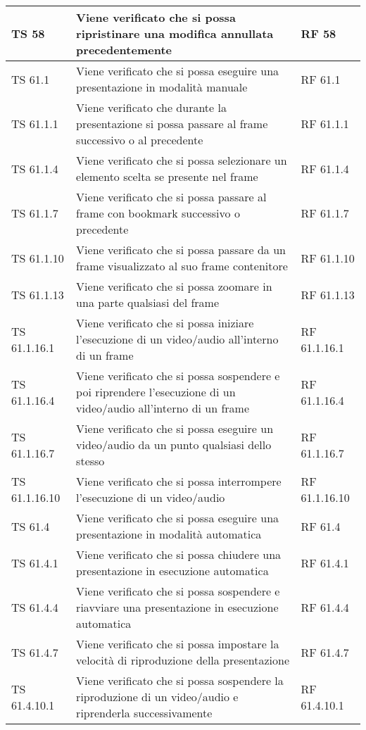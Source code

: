 {{\begin{longtable} [c]{| p{3cm} | p{6cm} |p{3cm}|}
			\hline
			TS 58 & Viene verificato che si possa ripristinare una modifica annullata precedentemente  & RF 58\\
			\hline
			TS 61.1 & Viene verificato che si possa eseguire una presentazione in modalità manuale & RF 61.1\\
			\hline
			TS 61.1.1 & Viene verificato che durante la presentazione si possa passare al frame\ped{g} successivo o al precedente & RF 61.1.1\\
			\hline
			TS 61.1.4 & Viene verificato che si possa selezionare un elemento scelta\ped{g} se presente nel frame\ped{g} & RF 61.1.4\\
			\hline
			TS 61.1.7 & Viene verificato che si possa passare al frame\ped{g} con bookmark\ped{g} successivo o precedente & RF 61.1.7\\
			\hline
			TS 61.1.10 & Viene verificato che si possa passare da un frame\ped{g} visualizzato al suo frame\ped{g} contenitore & RF 61.1.10\\
			\hline
			TS 61.1.13 & Viene verificato che si possa zoomare in una parte qualsiasi del frame\ped{g} & RF 61.1.13\\
			\hline
			TS 61.1.16.1 & Viene verificato che si possa iniziare l’esecuzione di un video/audio all'interno di un frame\ped{g} & RF 61.1.16.1\\
			\hline
			TS 61.1.16.4 & Viene verificato che si possa sospendere\ped{g} e poi riprendere l'esecuzione di un video/audio all'interno di un frame\ped{g} & RF 61.1.16.4\\
			\hline
			TS 61.1.16.7 & Viene verificato che si possa eseguire un video/audio da un punto qualsiasi dello stesso & RF 61.1.16.7\\
			\hline
			TS 61.1.16.10 & Viene verificato che si possa interrompere l'esecuzione di un video/audio & RF 61.1.16.10\\
			\hline
			TS 61.4 & Viene verificato che si possa eseguire una presentazione in modalità automatica & RF 61.4\\
			\hline
			TS 61.4.1 & Viene verificato che si possa chiudere una presentazione in esecuzione automatica & RF 61.4.1\\
			\hline
			TS 61.4.4 & Viene verificato che si possa sospendere\ped{g} e riavviare una presentazione in esecuzione automatica & RF 61.4.4\\
			\hline
			TS 61.4.7 & Viene verificato che si possa impostare la velocità di riproduzione della presentazione & RF 61.4.7\\
			\hline
			TS 61.4.10.1 & Viene verificato che si possa sospendere la riproduzione di un video/audio e riprenderla successivamente & RF 61.4.10.1\\

\end{longtable}}}
